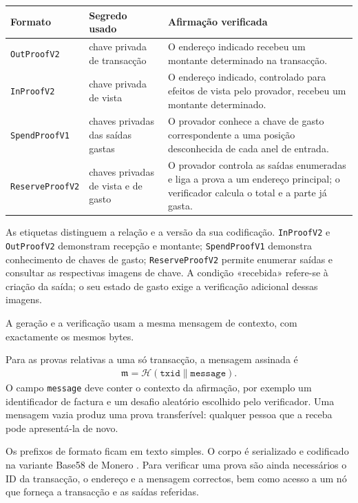 \begin{center}
\small
\begin{tabular}{@{}l >{\raggedright\arraybackslash}p{3.4cm}
  >{\raggedright\arraybackslash}p{8.4cm}@{}}
\toprule
\textbf{Formato} & \textbf{Segredo usado} & \textbf{Afirmação verificada} \\
\midrule
\texttt{OutProofV2} & chave privada de transacção & O endereço indicado recebeu
um montante determinado na transacção. \\
\addlinespace
\texttt{InProofV2} & chave privada de vista & O endereço indicado, controlado
para efeitos de vista pelo provador, recebeu um montante determinado. \\
\addlinespace
\texttt{SpendProofV1} & chaves privadas das saídas gastas & O provador conhece
a chave de gasto correspondente a uma posição desconhecida de cada anel de
entrada. \\
\addlinespace
\texttt{ReserveProofV2} & chaves privadas de vista e de gasto & O provador
controla as saídas enumeradas e liga a prova a um endereço principal; o
verificador calcula o total e a parte já gasta. \\
\bottomrule
\end{tabular}
\end{center}

As etiquetas distinguem a relação e a versão da sua codificação.
\texttt{InProofV2} e \texttt{OutProofV2} demonstram recepção e montante;
\texttt{SpendProofV1} demonstra conhecimento de chaves de gasto;
\texttt{ReserveProofV2} permite enumerar saídas e consultar as respectivas
imagens de chave. A condição «recebida» refere-se à criação da saída; o seu
estado de gasto exige a verificação adicional dessas imagens.

A geração e a verificação usam a mesma mensagem de contexto, com exactamente
os mesmos bytes.

Para as provas relativas a uma só transacção, a mensagem assinada é
\begin{align*}
 \mathfrak m=\mathcal H(\texttt{txid}\mathbin\|\texttt{message}).
\end{align*}
O campo \texttt{message} deve conter o contexto da afirmação, por exemplo um
identificador de factura e um desafio aleatório escolhido pelo verificador.
Uma mensagem vazia produz uma prova transferível: qualquer pessoa que a
receba pode apresentá-la de novo.

Os prefixos de formato ficam em texto simples. O corpo é serializado e
codificado na variante Base58 de Monero \cite{base-58-encoding}. Para verificar
uma prova são ainda necessários o ID da transacção, o endereço e a mensagem
correctos, bem como acesso a um nó que forneça a transacção e as saídas
referidas.

